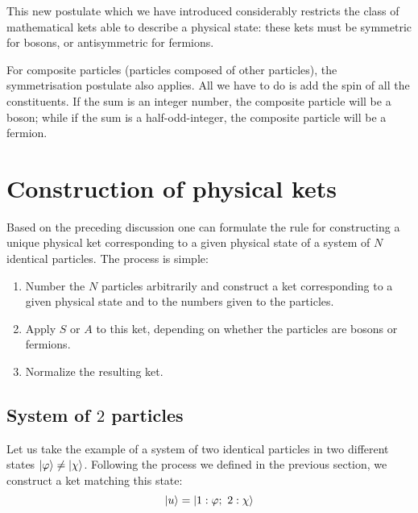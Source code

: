 This new postulate which we have introduced considerably restricts the class of mathematical kets able to describe a physical state: these kets must be symmetric for bosons, or antisymmetric for fermions.

For composite particles (particles composed of other particles), the symmetrisation postulate also applies. All we have to do is add the spin of all the constituents. If the sum is an integer number, the composite particle will be a boson; while if the sum is a half-odd-integer, the composite particle will be a fermion.

\section{Construction of physical kets}

Based on the preceding discussion one can formulate the rule for constructing a unique physical ket corresponding to a given physical state of a system of $N$ identical particles. The process is simple:
\begin{enumerate}
    \item Number the $N$ particles arbitrarily and construct a ket corresponding to a given physical state and to the numbers given to the particles.
    \item Apply $S$ or $A$ to this ket, depending on whether the particles are bosons or fermions.
    \item Normalize the resulting ket.
\end{enumerate}

\subsection{System of $2$ particles}

Let us take the example of a system of two identical particles in two different states $\ket{\varphi}\neq \ket{\chi}$. Following the process we defined in the previous section, we construct a ket matching this state:
\begin{equation}
    \ket{u} = \ket{1:\varphi;\ 2:\chi}
\end{equation} 

